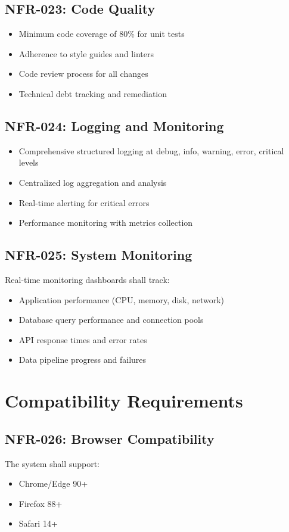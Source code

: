 \documentclass{report}
\begin{document}
\subsection{NFR-023: Code Quality}
\begin{itemize}
    \item Minimum code coverage of 80\% for unit tests
    \item Adherence to style guides and linters
    \item Code review process for all changes
    \item Technical debt tracking and remediation
\end{itemize}

\subsection{NFR-024: Logging and Monitoring}
\begin{itemize}
    \item Comprehensive structured logging at debug, info, warning, error, critical levels
    \item Centralized log aggregation and analysis
    \item Real-time alerting for critical errors
    \item Performance monitoring with metrics collection
\end{itemize}

\subsection{NFR-025: System Monitoring}
Real-time monitoring dashboards shall track:
\begin{itemize}
    \item Application performance (CPU, memory, disk, network)
    \item Database query performance and connection pools
    \item API response times and error rates
    \item Data pipeline progress and failures
\end{itemize}

\section{Compatibility Requirements}

\subsection{NFR-026: Browser Compatibility}
The system shall support:
\begin{itemize}
    \item Chrome/Edge 90+
    \item Firefox 88+
    \item Safari 14+
\end{itemize}
\end{document}
